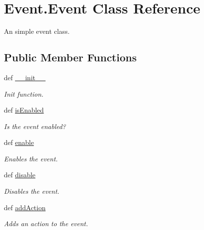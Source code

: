 \hypertarget{class_event_1_1_event}{
\section{Event.Event Class Reference}
\label{class_event_1_1_event}
}


An simple event class.  


\subsection*{Public Member Functions}
\begin{DoxyCompactItemize}
\item 
def \hyperlink{class_event_1_1_event_a6a55d45f3b2b402796e3a367758b801e}{\_\-\_\-init\_\-\_\-}
\begin{DoxyCompactList}\small\item\em Init function. \item\end{DoxyCompactList}\item 
def \hyperlink{class_event_1_1_event_a9e9e2dec79222e0a3893b23f8e0cdc82}{isEnabled}
\begin{DoxyCompactList}\small\item\em Is the event enabled? \item\end{DoxyCompactList}\item 
def \hyperlink{class_event_1_1_event_a2ea9f5d6236f4a9b36e998c1e9a5693e}{enable}
\begin{DoxyCompactList}\small\item\em Enables the event. \item\end{DoxyCompactList}\item 
def \hyperlink{class_event_1_1_event_a057727e18e2187d5db292574c9150484}{disable}
\begin{DoxyCompactList}\small\item\em Disables the event. \item\end{DoxyCompactList}\item 
def \hyperlink{class_event_1_1_event_a34c4bb0f35f9e4cc624a3ac85a17de00}{addAction}
\begin{DoxyCompactList}\small\item\em Adds an action to the event. \item\end{DoxyCompactList}\item 

\end{DoxyCompactItemize}
